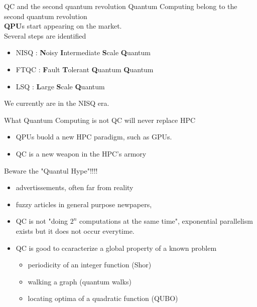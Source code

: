 \begin{frame}{QC and the second quantum revolution}
Quantum Computing belong to the second quantum revolution\\[0.5cm]

 \textbf{QPU}s start appearing on the market. \\[0.5cm]

Several steps are identified
\begin{itemize}
    \item NISQ : \textbf{N}oisy \textbf{I}ntermediate \textbf{S}cale \textbf{Q}uantum
    \item FTQC : \textbf{F}ault \textbf{T}olerant \textbf{Q}uantum \textbf{Q}uantum
    \item LSQ : \textbf{L}arge \textbf{S}cale \textbf{Q}uantum
\end{itemize}
We currently are in the NISQ era. 


\end{frame}

\begin{frame}{What Quantum Computing is not}
QC will never replace HPC
\begin{itemize}
    \item QPUs buold a new HPC paradigm, such as GPUs.
    \item QC is a new weapon in the HPC's armory
\end{itemize}

Beware the "Quantul Hype"!!!!
\begin{itemize}
    \item advertissements, often far from reality
    \item fuzzy articles in general purpose newpapers, 
    \item QC is not "doing $2^n$ computations at the same time", exponential parallelism exists but it does not 
    occur everytime.
    \item  QC  is good to ccaracterize a global property of a known problem
    \begin{itemize}
        \item periodicity of an integer function (Shor)
        \item walking a graph (quantum walks)
        \item locating optima of a quadratic function (QUBO)
    \end{itemize}
\end{itemize}
\end{frame}
